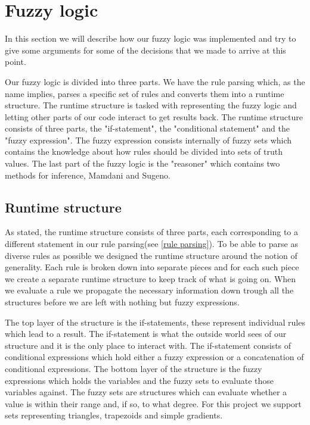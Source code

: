 \section{Fuzzy logic}\label{fuzzy logic}
In this section we will describe how our fuzzy logic was implemented and try to
give some arguments for some of the decisions that we made to arrive
at this point.

Our fuzzy logic is divided into three parts. We have the rule parsing which, as
the name implies, parses a specific set of rules and converts them into a runtime
structure. The runtime structure is tasked with representing the fuzzy logic and
letting other parts of our code interact to get results back. The runtime structure
consists of three parts, the "if-statement", the "conditional statement" and
the "fuzzy expression". The fuzzy expression consists internally of fuzzy sets
which contains the knowledge about how rules should be divided into sets of truth
values. The last part of the fuzzy logic is the "reasoner" which contains two 
methods for inference, Mamdani and Sugeno.

\subsection{Runtime structure}\label{runtime structure}
As stated, the runtime structure consists of three parts, each corresponding to
a different statement in our rule parsing(see \ref{rule parsing}). To be able
to parse as diverse rules as possible we designed the runtime structure around
the notion of generality. Each rule is broken down into separate pieces and for
each such piece we create a separate runtime structure to keep track of what
is going on. When we evaluate a rule we propagate the necessary information
down trough all the structures before we are left with nothing but fuzzy expressions.

The top layer of the structure is the if-statements, these represent individual
rules which lead to a result. The if-statement is what the outside world sees
of our structure and it is the only place to interact with. The if-statement
consists of conditional expressions which hold either a fuzzy expression or
a concatenation of conditional expressions. The bottom layer of the structure
is the fuzzy expressions which holds the variables and the fuzzy sets to evaluate
those variables against. The fuzzy sets are structures which can evaluate whether
a value is within their range and, if so, to what degree. For this project
we support sets representing triangles, trapezoids and simple gradients.


